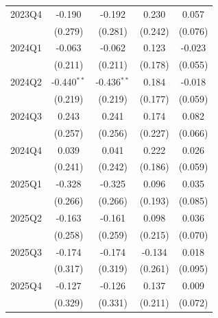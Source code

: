 \begin{table}[htbp]
\begin{tabular}{lcccc}
2023Q4 & -0.190 & -0.192 & 0.230 & 0.057 \\
 & (0.279) & (0.281) & (0.242) & (0.076) \\
2024Q1 & -0.063 & -0.062 & 0.123 & -0.023 \\
 & (0.211) & (0.211) & (0.178) & (0.055) \\
2024Q2 & -0.440$^{**}$ & -0.436$^{**}$ & 0.184 & -0.018 \\
 & (0.219) & (0.219) & (0.177) & (0.059) \\
2024Q3 & 0.243 & 0.241 & 0.174 & 0.082 \\
 & (0.257) & (0.256) & (0.227) & (0.066) \\
2024Q4 & 0.039 & 0.041 & 0.222 & 0.026 \\
 & (0.241) & (0.242) & (0.186) & (0.059) \\
2025Q1 & -0.328 & -0.325 & 0.096 & 0.035 \\
 & (0.266) & (0.266) & (0.193) & (0.085) \\
2025Q2 & -0.163 & -0.161 & 0.098 & 0.036 \\
 & (0.258) & (0.259) & (0.215) & (0.070) \\
2025Q3 & -0.174 & -0.174 & -0.134 & 0.018 \\
 & (0.317) & (0.319) & (0.261) & (0.095) \\
2025Q4 & -0.127 & -0.126 & 0.137 & 0.009 \\
 & (0.329) & (0.331) & (0.211) & (0.072) \\
\bottomrule
\end{tabular}
\par\vspace{2pt}{\footnotesize Reference quarter 2022Q3 omitted. Standard errors clustered on occupation in parentheses. * p<0.10, ** p<0.05, *** p<0.01.}
\end{table}
